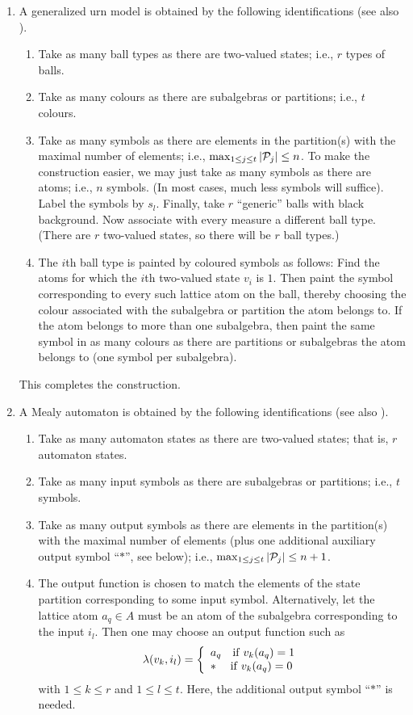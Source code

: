 \begin{enumerate}
\begin{enumerate}
\item  A  generalized urn model  is obtained by the following identifications
(see also \cite[p. 271]{wright:pent}).
\begin{enumerate}
\item
Take as many ball types as there are two-valued states; i.e.,
$r$ types of balls.
\item
Take as many colours as there are subalgebras or partitions; i.e., $t$ colours.
\item
Take as many symbols as there are elements in the partition(s) with the maximal number of elements;
i.e., $\max_{1\le j\le t}\vert {\cal P}_j\vert \le n$.
To make the construction easier, we may just take as many symbols as there are atoms; i.e., $n$ symbols.
(In most cases, much less symbols will suffice).
Label the symbols by $s_l$.
Finally, take $r$ ``generic'' balls with black background.
Now associate with every measure a different ball type.
(There are $r$ two-valued states, so there will be $r$ ball types.)
\item
The $i$th ball type is painted by coloured
symbols  as follows:
Find the atoms  for which the $i$th two-valued state $v_i$ is $1$.
Then paint the symbol corresponding to every such lattice atom on the ball, thereby choosing
the colour associated with the subalgebra or partition
the atom belongs to.
If the atom belongs to more than one subalgebra,
then paint the same symbol in as many colours as there are partitions or subalgebras
the atom belongs to (one symbol per subalgebra).
\end{enumerate}
This completes the construction.



\item  A Mealy automaton is obtained by the following identifications
(see also \cite[pp. 154--155]{svozil-93}).
\begin{enumerate}
\item
Take as many automaton states as there are two-valued states; that is,
$r$  automaton states.
\item
Take as many input symbols as there are subalgebras or partitions; i.e., $t$ symbols.
\item
Take as many output symbols as there are elements in the partition(s) with the maximal number of elements
(plus one additional auxiliary output symbol ``$\ast$'', see below);
i.e., $\max_{1\le j\le t}\vert {\cal P}_j\vert \le n+1$.
\item
The output function is chosen to match the elements of the state partition corresponding
to some input symbol.
Alternatively, let the lattice atom $a_q\in A$
must be an atom of the subalgebra corresponding to the input $i_l$.
Then one may choose an output function such as
$$
\lambda (v_k,i_l)= \left\{
\begin{array}{l}
a_q \quad{\rm if }\;v_k (a_q)= 1\\
\ast \; \quad {\rm if }\;v_k (a_q)= 0\\
\end{array}
\right.
$$
with
$1\le k \le r$
and
$1\le l \le t$.
Here, the additional output symbol ``$\ast$'' is needed.


\end{enumerate}
\end{enumerate}
\end{enumerate}
